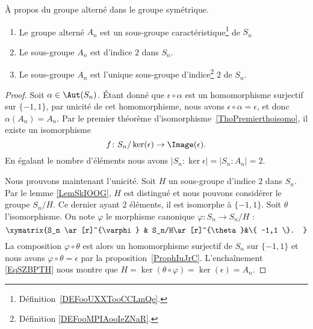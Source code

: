 \begin{proposition} \label{PROPooCPXOooVxPAij}
    À propos du groupe alterné dans le groupe symétrique.
    \begin{enumerate}
        \item
            Le groupe alterné \( A_n\) est un sous-groupe caractéristique\footnote{Définition~\ref{DEFooUXXTooCCLmQe}.} de \( S_n\)
        \item   \label{ITEMooWXXUooOWvFgE}
            Le sous-groupe \( A_n\) est d'indice \( 2\) dans \( S_n\).
        \item       \label{ITEMooGGAHooRYgNqq}
            Le sous-groupe \( A_n\) est l'unique sous-groupe d'indice\footnote{Définition \ref{DEFooMPIAooIeZNaR}.} \( 2\) de \( S_n\).
    \end{enumerate}
\end{proposition}

\begin{proof}
    Soit \( \alpha\in \Aut(S_n)\). Étant donné que \( \epsilon\circ\alpha\) est un homomorphisme surjectif sur \( \{ -1,1 \}\), par unicité de cet homomorphisme, nous avons \( \epsilon\circ\alpha=\epsilon\), et donc \( \alpha(A_n)=A_n\). Par le premier théorème d'isomorphisme~\ref{ThoPremierthoisomo}, il existe un isomorphisme
    \begin{equation}
        f\colon S_n/\ker(\epsilon)\to \Image(\epsilon).
    \end{equation}
    En égalant le nombre d'éléments nous avons \( | S_n:\ker\epsilon |=| S_n:A_n |=2\).

    Nous prouvons maintenant l'unicité. Soit \( H\) un sous-groupe d'indice \( 2\) dans \( S_n\). Par le lemme \ref{LemSkIOOG}, \( H\) est distingué et nous pouvons considérer le groupe \( S_n/H\). Ce dernier ayant \( 2\) éléments, il est isomorphe à \( \{ -1,1 \}\). Soit \( \theta\) l'isomorphisme. On note \( \varphi\) le morphisme canonique \( \varphi\colon S_n\to S_n/H\) :
    \begin{equation}    \label{EqSZBPTH}
        \xymatrix{%
        S_n \ar[r]^{\varphi}        &   S_n/H\ar[r]^{\theta}&\{ -1,1 \}.
           }
    \end{equation}
    La composition \( \varphi\circ \theta\) est alors un homomorphisme surjectif de \( S_n\) sur \( \{ -1,1 \}\) et nous avons \( \varphi\circ\theta=\epsilon\) par la proposition~\ref{ProphIuJrC}. L'enchaînement \eqref{EqSZBPTH} nous montre que \( H=\ker(\theta\circ\varphi)=\ker(\epsilon)=A_n\).
\end{proof}

